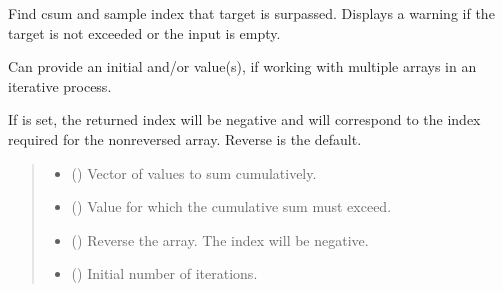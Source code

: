 \documentclass[letterpaper,10pt,english]{sphinxmanual}
\begin{document}
\begin{fulllineitems}
\label{\detokenize{misc:glomar_gridding.covariance_tools.csum_up_to_val}}
\pysigstartsignatures
\pysiglinewithargsret
{}
{\sphinxparamcomma {}\sphinxparamcomma {}\sphinxparamcomma {}\sphinxparamcomma {}}
{}
\pysigstopsignatures
\sphinxAtStartPar
Find csum and sample index that target is surpassed. Displays a warning if
the target is not exceeded or the input  is empty.

\sphinxAtStartPar
Can provide an initial  and/or  value(s), if working with
multiple arrays in an iterative process.

\sphinxAtStartPar
If  is set, the returned index will be negative and will correspond
to the index required for the non\sphinxhyphen{}reversed array. Reverse is the default.
\begin{quote}\begin{description}
\begin{itemize}
\item {}
\sphinxAtStartPar
{} () \textendash{} Vector of values to sum cumulatively.

\item {}
\sphinxAtStartPar
{} () \textendash{} Value for which the cumulative sum must exceed.

\item {}
\sphinxAtStartPar
{} () \textendash{} Reverse the array. The index will be negative.

\item {}
\sphinxAtStartPar
{} () \textendash{} Initial number of iterations.


\end{itemize}
\end{description}
\end{quote}
\end{fulllineitems}
\end{document}
